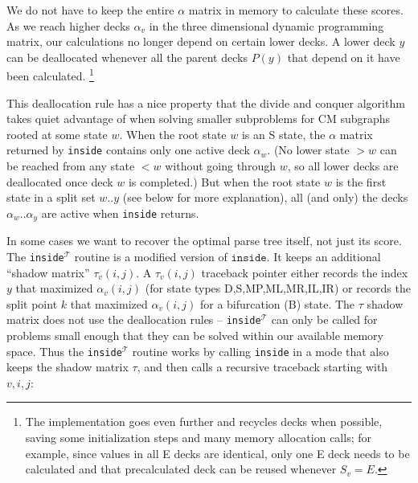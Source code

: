 \documentclass[11pt]{article}
\begin{document}
We do not have to keep the entire $\alpha$ matrix in memory to
calculate these scores.  As we reach higher decks $\alpha_v$ in the
three dimensional dynamic programming matrix, our calculations no
longer depend on certain lower decks. A lower deck $y$ can be
deallocated whenever all the parent decks $P(y)$ that depend on it
have been calculated. \footnote{The implementation goes even further
and recycles decks when possible, saving some initialization steps and
many memory allocation calls; for example, since values in all E decks
are identical, only one E deck needs to be calculated and that
precalculated deck can be reused whenever $S_v = E$.}

This deallocation rule has a nice property that the divide and conquer
algorithm takes quiet advantage of when solving smaller subproblems
for CM subgraphs rooted at some state $w$.  When the root state $w$ is
an S state, the $\alpha$ matrix returned by \texttt{inside} contains
only one active deck $\alpha_w$. (No lower state $>w$ can be reached
from any state $<w$ without going through $w$, so all lower decks are
deallocated once deck $w$ is completed.) But when the root state $w$
is the first state in a split set $w..y$ (see below for more
explanation), all (and only) the decks $\alpha_w..\alpha_y$ are active
when \texttt{inside} returns.

In some cases we want to recover the optimal parse tree itself, not
just its score. The \texttt{inside}$^{\mathcal{T}}$ routine is a
modified version of $\texttt{inside}$. It keeps an additional ``shadow
matrix'' $\tau_v(i,j)$. A $\tau_v(i,j)$ traceback pointer either
records the index $y$ that maximized $\alpha_v(i,j)$ (for state types
D,S,MP,ML,MR,IL,IR) or records the split point $k$ that maximized
$\alpha_v(i,j)$ for a bifurcation (B) state. The $\tau$ shadow matrix
does not use the deallocation rules -- \texttt{inside}$^{\mathcal{T}}$
can only be called for problems small enough that they can be solved
within our available memory space. Thus the
\texttt{inside}$^{\mathcal{T}}$ routine works by calling
\texttt{inside} in a mode that also keeps the shadow matrix $\tau$,
and then calls a recursive traceback starting with $v,i,j$:
\end{document}
